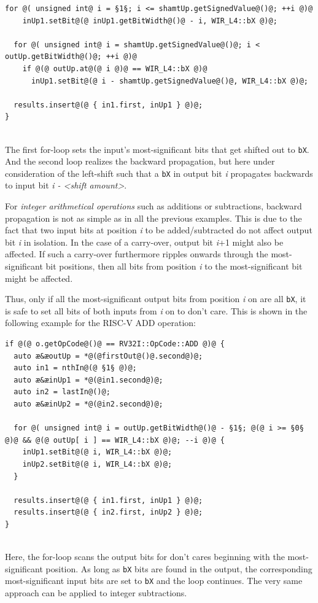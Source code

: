 \begin{enumerate}[resume]
\begin{lstlisting}[style=code,float=!h,xleftmargin=10mm,aboveskip=-0.8 \baselineskip,belowskip=-0.8 \baselineskip]
  for @( unsigned int@ i = §1§; i <= shamtUp.getSignedValue@()@; ++i @)@
    inUp1.setBit@(@ inUp1.getBitWidth@()@ - i, WIR_L4::bX @)@;

  for @( unsigned int@ i = shamtUp.getSignedValue@()@; i < outUp.getBitWidth@()@; ++i @)@
    if @(@ outUp.at@(@ i @)@ == WIR_L4::bX @)@
      inUp1.setBit@(@ i - shamtUp.getSignedValue@()@, WIR_L4::bX @)@;

  results.insert@(@ { in1.first, inUp1 } @)@;
}
\end{lstlisting}
  \\
  The first for-loop sets the input's most-significant bits that get shifted out to \texttt{bX}.
  And the second loop realizes the backward propagation, but here under consideration of the left-shift such that a \texttt{bX} in output bit \emph{i} propagates backwards to input bit \emph{i - <shift amount>}.

  For \emph{integer arithmetical operations} such as additions or subtractions,
  backward propagation is not as simple as in all the previous examples.
  This is due to the fact that two input bits at position \emph{i} to be added/subtracted do not affect output bit \emph{i} in isolation.
  In the case of a carry-over, output bit \emph{i}+1 might also be affected.
  If such a carry-over furthermore ripples onwards through the most-significant bit positions, then all bits from position \emph{i} to the most-significant bit might be affected.

  Thus, only if all the most-significant output bits from position \emph{i} on are all \texttt{bX}, it is safe to set all bits of both inputs from \emph{i} on to don't care.
  This is shown in the following example for the RISC-V ADD operation: \\
\begin{lstlisting}[style=code,float=!h,xleftmargin=10mm,aboveskip=-0.8 \baselineskip,belowskip=-0.8 \baselineskip]
if @(@ o.getOpCode@()@ == RV32I::OpCode::ADD @)@ {
  auto æ&æoutUp = *@(@firstOut@()@.second@)@;
  auto in1 = nthIn@(@ §1§ @)@;
  auto æ&æinUp1 = *@(@in1.second@)@;
  auto in2 = lastIn@()@;
  auto æ&æinUp2 = *@(@in2.second@)@;

  for @( unsigned int@ i = outUp.getBitWidth@()@ - §1§; @(@ i >= §0§ @)@ && @(@ outUp[ i ] == WIR_L4::bX @)@; --i @)@ {
    inUp1.setBit@(@ i, WIR_L4::bX @)@;
    inUp2.setBit@(@ i, WIR_L4::bX @)@;
  }

  results.insert@(@ { in1.first, inUp1 } @)@;
  results.insert@(@ { in2.first, inUp2 } @)@;
}
\end{lstlisting}
  \\
  Here, the for-loop scans the output bits for don't cares beginning with the most-significant position.
  As long as \texttt{bX} bits are found in the output, the corresponding most-significant input bits are set to \texttt{bX} and the loop continues.
  The very same approach can be applied to integer subtractions.


\end{enumerate}
